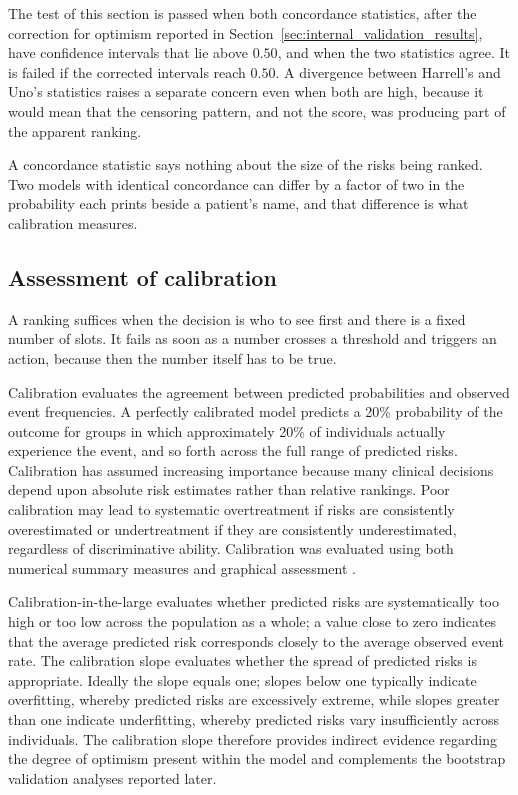 The test of this section is passed when both concordance statistics, after the correction for optimism reported in Section~\ref{sec:internal_validation_results}, have confidence intervals that lie above $0.50$, and when the two statistics agree. It is failed if the corrected intervals reach $0.50$. A divergence between Harrell's and Uno's statistics raises a separate concern even when both are high, because it would mean that the censoring pattern, and not the score, was producing part of the apparent ranking.

\medskip
{}

\medskip
\noindent A concordance statistic says nothing about the size of the risks being ranked. Two models with identical concordance can differ by a factor of two in the probability each prints beside a patient's name, and that difference is what calibration measures.

\subsection{Assessment of calibration}
\label{sec:prog-calib}

\noindent A ranking suffices when the decision is who to see first and there is a fixed number of slots. It fails as soon as a number crosses a threshold and triggers an action, because then the number itself has to be true.

Calibration evaluates the agreement between predicted probabilities and observed event frequencies. A perfectly calibrated model predicts a 20\% probability of the outcome for groups in which approximately 20\% of individuals actually experience the event, and so forth across the full range of predicted risks. Calibration has assumed increasing importance because many clinical decisions depend upon absolute risk estimates rather than relative rankings. Poor calibration may lead to systematic overtreatment if risks are consistently overestimated or undertreatment if they are consistently underestimated, regardless of discriminative ability. Calibration was evaluated using both numerical summary measures and graphical assessment \citep{vancalster_2019}.

Calibration-in-the-large evaluates whether predicted risks are systematically too high or too low across the population as a whole; a value close to zero indicates that the average predicted risk corresponds closely to the average observed event rate. The calibration slope evaluates whether the spread of predicted risks is appropriate. Ideally the slope equals one; slopes below one typically indicate overfitting, whereby predicted risks are excessively extreme, while slopes greater than one indicate underfitting, whereby predicted risks vary insufficiently across individuals. The calibration slope therefore provides indirect evidence regarding the degree of optimism present within the model and complements the bootstrap validation analyses reported later.

